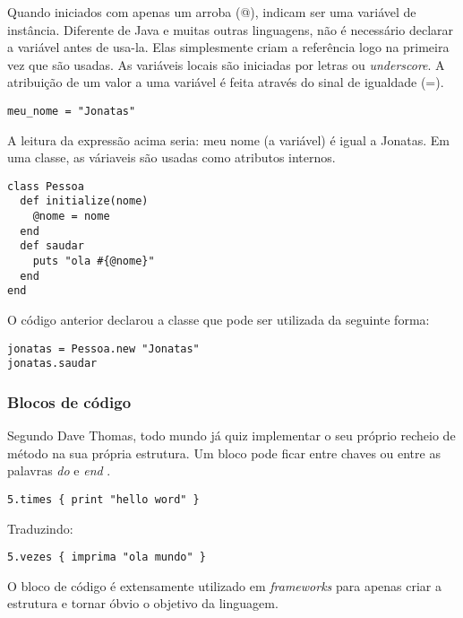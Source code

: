 \documentclass[12pt]{article}
\begin{document}
Quando iniciados com apenas um arroba (@), indicam ser uma variável de instância. Diferente de Java e muitas outras linguagens, não é necessário declarar a variável antes de usa-la. Elas simplesmente criam a referência logo na primeira vez que são usadas.
As variáveis locais são iniciadas por letras ou \textit{underscore}.
A atribuição de um valor a uma variável é feita através do sinal de igualdade (=).

\begin{lstlisting}[caption=Exemplo de variável local ]
meu_nome = "Jonatas"
\end{lstlisting}

A leitura da expressão acima seria: meu nome (a variável) é igual a Jonatas.
Em uma classe, as váriaveis são usadas como atributos internos.

\begin{lstlisting}[caption=Exemplo de variável de instância em uma classe ]
class Pessoa
  def initialize(nome)
    @nome = nome
  end
  def saudar
    puts "ola #{@nome}"
  end
end
\end{lstlisting}

O código anterior declarou a classe que pode ser utilizada da seguinte forma:

\begin{lstlisting}[caption=Exemplo de utilização da classe descrita acima ]
jonatas = Pessoa.new "Jonatas"
jonatas.saudar 
\end{lstlisting}

\subsubsection { Blocos de código }

\cite{programmingRuby}
Segundo Dave Thomas, todo mundo já quiz implementar o seu próprio recheio de método na sua própria estrutura. Um bloco pode ficar entre chaves ou entre as palavras \textit{ do } e \textit{ end }.

\begin{lstlisting}[caption=Exemplo de bloco de código ]
   5.times { print "hello word" }
\end{lstlisting}

Traduzindo: 
\begin{lstlisting}[caption=Exemplo de bloco de código ]
   5.vezes { imprima "ola mundo" }
\end{lstlisting}

O bloco de código é extensamente utilizado em \textit{frameworks} para apenas criar a estrutura e tornar óbvio o objetivo da linguagem.
\end{document}
